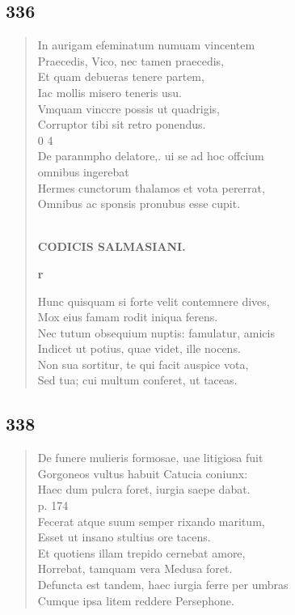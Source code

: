 \documentclass[11pt, a4paper]{report}
\begin{document}
            \subsection*{336}
      \begin{verse}
      In aurigam efeminatum numuam vincentem \\ Praecedis, Vico, nec tamen praecedis, \\ Et quam debueras tenere partem, \\ Iac mollis misero teneris usu. \\ Vmquam vinccre possis ut quadrigis, \\ Corruptor tibi sit retro ponendus. \\ 0 4 \\ De paranmpho delatore,. ui se ad hoc offcium \\ omnibus ingerebat \\ Hermes cunctorum thalamos et vota pererrat, \\ Omnibus ac sponsis pronubus esse cupit. \\ 
        ﻿\pagebreak 
    \begin{center} \textbf{CODICIS SALMASIANI.} \end{center}\begin{center} \textbf{r} \end{center}Hunc quisquam  \lbrack si \rbrack  forte velit contemnere dives, \\ Mox eius famam rodit iniqua ferens. \\ Nec tutum obsequium nuptis: famulatur, amicis \\ Indicet ut potius, quae videt, ille nocens. \\ Non sua sortitur, te qui facit auspice vota, \\ Sed tua; cui multum conferet, ut taceas. \\ 
      \end{verse}
  
            \subsection*{338}
      \begin{verse}
      De funere mulieris formosae, uae litigiosa fuit \\ Gorgoneos vultus habuit Catucia coniunx: \\ Haec dum pulcra foret, iurgia saepe dabat. \\ p. 174 \\ Fecerat atque  \lbrack suum \rbrack  semper rixando maritum, \\ Esset ut insano stultius ore tacens. \\ Et quotiens illam trepido cernebat amore, \\ Horrebat, tamquam vera Medusa foret. \\ Defuncta est tandem, haec iurgia ferre per umbras \\ Cumque ipsa litem reddere Persephone. \\ 
      \end{verse}
  
\end{document}
